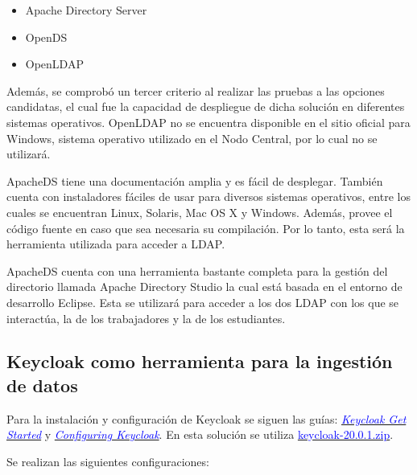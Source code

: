 \begin{itemize}
	\item Apache Directory Server
	\item OpenDS
	\item OpenLDAP
\end{itemize}

Además, se comprobó un tercer criterio al realizar las pruebas a las opciones candidatas, el cual fue la capacidad de despliegue de dicha solución en diferentes sistemas operativos. OpenLDAP no se encuentra disponible en el sitio oficial para Windows, sistema operativo utilizado en el Nodo Central, por lo cual no se utilizará. 

ApacheDS tiene una documentación amplia y es fácil de desplegar. También cuenta con instaladores fáciles de usar para diversos sistemas operativos, entre los cuales se encuentran Linux, Solaris, Mac OS X y Windows. Además, provee el código fuente en caso que sea necesaria su compilación. Por lo tanto, esta será la herramienta utilizada para acceder a LDAP.

ApacheDS cuenta con una herramienta bastante completa para la gestión del directorio llamada Apache Directory Studio la cual está basada en el entorno de desarrollo Eclipse. Esta se utilizará para acceder a los dos LDAP con los que se interactúa, la de los trabajadores y la de los estudiantes.

\subsection{Keycloak como herramienta para la ingestión de datos} \label{keycloak-config}
%

Para la instalación y configuración de Keycloak se siguen las guías: \href{https://www.keycloak.org/getting-started/getting-started-zip}{\textcolor{blue}{\textit{Keycloak Get Started}}} y \href{https://www.keycloak.org/server/configuration}{\textit{\textcolor{blue}{Configuring Keycloak}}}. En esta solución se utiliza \href{https://github.com/keycloak/keycloak/releases/download/20.0.1/keycloak-20.0.1.zip}{\textcolor{blue}{keycloak-20.0.1.zip}}.

Se realizan las siguientes configuraciones:



